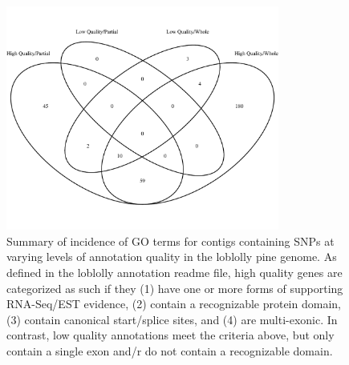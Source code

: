 \documentclass[smallextended]{svjour3}
\begin{document}
\clearpage

\begin{figure}[ht]
\centering
\includegraphics[width=0.8\textwidth]{snp_venn}
\caption{Summary of incidence of GO terms for contigs containing SNPs at varying
  levels of annotation quality in the loblolly pine genome. As defined in the
  loblolly annotation readme file, high quality genes are categorized as such if
  they (1) have one or more forms of supporting RNA-Seq/EST evidence, (2)
  contain a recognizable protein domain, (3) contain canonical start/splice
  sites, and (4) are multi-exonic. In contrast, low quality annotations meet the
  criteria above, but only contain a single exon and/r do not contain a
  recognizable domain.}
\label{f:snp_venn}
\end{figure}

\clearpage
\end{document}
